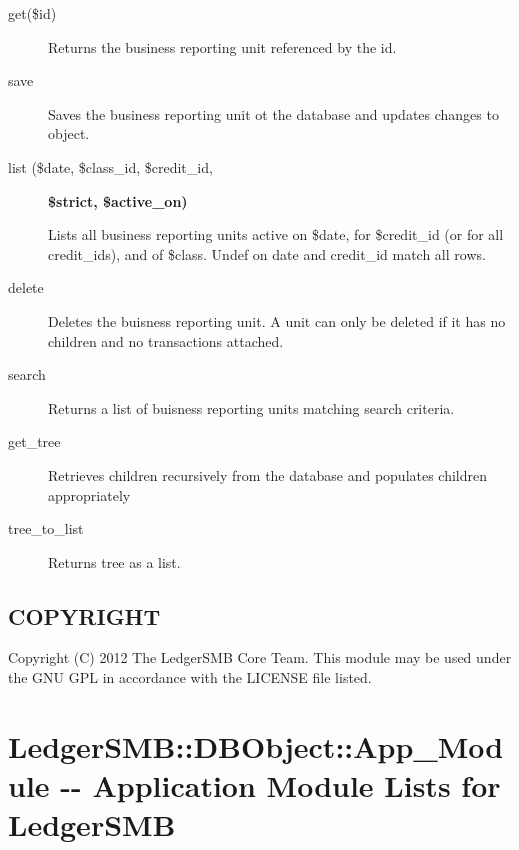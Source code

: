 \begin{description}
\begin{description}
\begin{description}
\begin{description}
\begin{description}
\begin{description}
\begin{description}
\begin{description}
\begin{description}
\begin{description}
\begin{description}
\item[{get(\$id)}] \mbox{}

Returns the business reporting unit referenced by the id.


\item[{save}] \mbox{}

Saves the business reporting unit ot the database and updates changes to object.


\item[{list (\$date, \$class\_id, \$credit\_id,}] \textbf{\$strict, \$active\_on)}

Lists all business reporting units active on \$date, for \$credit\_id (or for all
credit\_ids), and of \$class.  Undef on date and credit\_id match all rows.


\item[{delete}] \mbox{}

Deletes the buisness reporting unit.  A unit can only be deleted if it has no 
children and no transactions attached.


\item[{search}] \mbox{}

Returns a list of buisness reporting units matching search criteria.


\item[{get\_tree}] \mbox{}

Retrieves children recursively from the database and populates children 
appropriately


\item[{tree\_to\_list}] \mbox{}

Returns tree as a list.

\end{description}
\subsection*{COPYRIGHT\label{LedgerSMB::DBObject::Business_Unit_Class_COPYRIGHT}}


Copyright (C) 2012 The LedgerSMB Core Team.  This module may be used under the
GNU GPL in accordance with the LICENSE file listed.

\section{LedgerSMB::DBObject::App\_Module -{}- Application Module Lists for LedgerSMB\label{LedgerSMB::DBObject::App_Module_-_-_Application_Module_Lists_for_LedgerSMB}}





\end{description}
\end{description}
\end{description}
\end{description}
\end{description}
\end{description}
\end{description}
\end{description}
\end{description}
\end{description}
